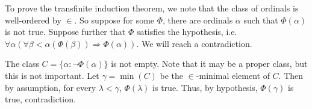 \documentclass[12pt]{article}
\begin{document}
To prove the transfinite induction theorem, we note that the class of ordinals is well-ordered by $\in$.  So suppose for some $\Phi$, there are ordinals $\alpha$ such that $\Phi(\alpha)$ is not true.  Suppose further that $\Phi$ satisfies the hypothesis, i.e. 
$\forall\alpha(\forall\beta<\alpha(\Phi(\beta))\Rightarrow\Phi(\alpha))$.  We will reach a contradiction.  

The class $C=\{\alpha:\neg\Phi(\alpha)\}$ is not empty.  Note that it may be a proper class, but this is not important.  Let $\gamma=\min(C)$ be the $\in$-minimal element of $C$.  Then by assumption, for every $\lambda<\gamma$, $\Phi(\lambda)$ is true.  Thus, by hypothesis, $\Phi(\gamma)$ is true, contradiction.
\end{document}
